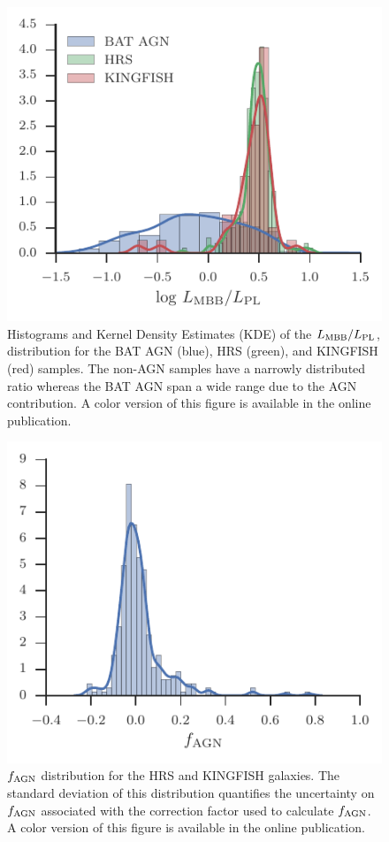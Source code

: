 \documentclass[fleqn, usenatbib]{mnras}
\begin{document}
\begin{figure}
\includegraphics[width=\columnwidth]{figures/lmbb-lpl-ratio}
\caption{Histograms and Kernel Density Estimates (KDE) of the $L_{\rm MBB}/L_{\rm PL}$, distribution for the BAT AGN (blue), HRS (green), and KINGFISH (red) samples. The non-AGN samples have a narrowly distributed ratio whereas the BAT AGN span a wide range due to the AGN contribution. A color version of this figure is available in the online publication. \label{fig:lmbb_lpl_ratio}}
\end{figure}

\begin{figure}
\includegraphics[width=\columnwidth]{figures/fagn_nonAGN}
\caption{$f_{\rm AGN}$ distribution for the HRS and KINGFISH galaxies. The standard deviation of this distribution quantifies the uncertainty on $f_{\rm AGN}$ associated with the correction factor used to calculate $f_{\rm AGN}$. A color version of this figure is available in the online publication. \label{fig:fagn_nonAGN}}
\end{figure}
\end{document}

